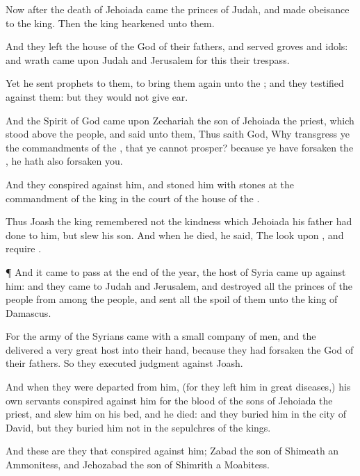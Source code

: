 {Now
after the
death of
Jehoiada
came the
princes of
Judah, and made
obeisance to the
king. Then the
king
hearkened unto them.

And they
left the
house of the
{}
God of their
fathers, and
served
groves and
idols: and
wrath came upon
Judah and
Jerusalem for this their
trespass.

Yet he
sent
prophets to them, to bring them
again unto the
{}; and they
testified against them: but they would not give
ear.

And the
Spirit of
God
came upon
Zechariah the
son of
Jehoiada the
priest, which
stood above the
people, and
said unto them, Thus
saith
God, Why
transgress ye the
commandments of the
{}, that ye cannot
prosper? because ye have
forsaken the
{}, he hath also
forsaken you.

And they
conspired against him, and
stoned him with
stones at the
commandment of the
king in the
court of the
house of the
{}.

Thus
Joash the
king
remembered not the
kindness which
Jehoiada his
father had
done to him, but
slew his
son. And when he
died, he
said, The
{}
look upon
{}, and
require
{}.


\par }{\PP {}¶ And it came to pass at the
end of the
year,
{} the
host of
Syria came
up against him: and they
came to
Judah and
Jerusalem, and
destroyed all the
princes of the
people from among the
people, and
sent all the
spoil of them unto the
king of
Damascus.

For the
army of the
Syrians
came with a
small company of
men, and the
{}
delivered a
very
great
host into their
hand, because they had
forsaken the
{}
God of their
fathers. So they
executed
judgment against
Joash.

And when they were
departed from him, (for they
left him in
great
diseases,) his own
servants
conspired against him for the
blood of the
sons of
Jehoiada the
priest, and
slew him on his
bed, and he
died: and they
buried him in the
city of
David, but they
buried him not in the
sepulchres of the
kings.

And these are they that
conspired against him;
Zabad the
son of
Shimeath an
Ammonitess, and
Jehozabad the
son of
Shimrith a
Moabitess.


}
